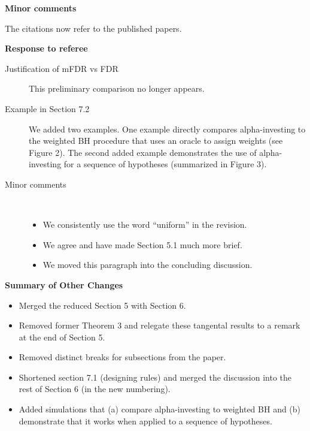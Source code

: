 \documentclass[12pt]{letter}
\begin{document}
{\bf Minor comments}

The citations now refer to the published papers.


\newpage
\centerline{\bf Response to referee}

\begin{description}

  \item[Justification of mFDR vs FDR] This preliminary comparison no longer appears.
  
  \item[Example in Section 7.2] We added two examples. One example directly compares    
         alpha-investing to the weighted BH procedure that uses an oracle to assign 
         weights (see Figure 2).  The second added example demonstrates the use
         of alpha-investing for a sequence of hypotheses (summarized in Figure 3).
         
   \item[Minor comments] \ \
      \begin{itemize}
        \item We consistently use the word ``uniform'' in the revision.
        \item We agree and have made Section 5.1 much more brief.
        \item We moved this paragraph into the concluding discussion.
      \end{itemize}
\end{description}

\newpage
\centerline{\bf Summary of Other Changes}

\begin{itemize}

  \item Merged the reduced Section 5 with Section 6.
  \item Removed former Theorem 3 and relegate these 
           tangental results to a remark at the end of Section 5.
  \item Removed distinct breaks for  subsections from the paper.
  \item Shortened section 7.1 (designing rules) and merged the discussion into the rest of
           Section 6 (in the new numbering).
  \item Added simulations that (a) compare alpha-investing to weighted BH and 
          (b) demonstrate that it works when applied to a sequence of hypotheses.

\end{itemize}
\end{document}
